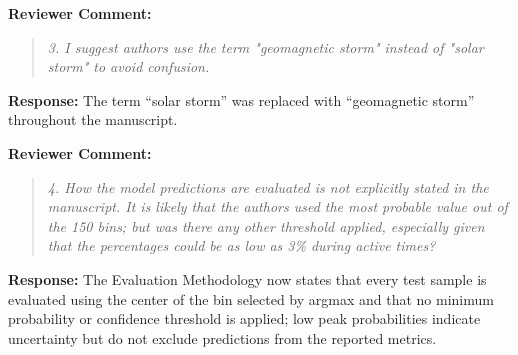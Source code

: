 \documentclass[a4paper,12pt]{article}
\newcommand{\reviewercomment}[1]{%
  \begin{samepage}%
  \par\noindent\textbf{Reviewer Comment:}\par
  \begin{quote}\itshape #1\end{quote}}
\newcommand{\filledresponse}[1]{%
  \par\noindent\textbf{Response:} #1\par
  \vspace{0.4cm}%
  \end{samepage}}
\begin{document}
\reviewercomment{3. I suggest authors use the term "geomagnetic storm" instead of "solar storm" to avoid confusion.}
\filledresponse{The term ``solar storm'' was replaced with ``geomagnetic storm'' throughout the manuscript.}

\reviewercomment{4. How the model predictions are evaluated is not explicitly stated in the manuscript. It is likely
that the authors used the most probable value out of the 150 bins; but was there any other threshold
applied, especially given that the percentages could be as low as 3\% during active times?}
\filledresponse{The Evaluation Methodology now states that every test sample is evaluated using
the center of the bin selected by argmax and that no minimum probability or confidence threshold
is applied; low peak probabilities indicate uncertainty but do not exclude predictions from the
reported metrics.}
\end{document}
